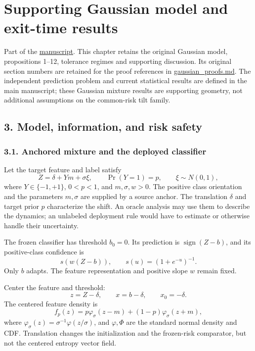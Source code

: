 \section{Supporting Gaussian model and exit-time
results}\label{draft-supporting-gaussian-model-and-exit-time-results}

Part of the \href{DRAFT.md}{manuscript}. This chapter retains the
original Gaussian model, propositions 1--12, tolerance regimes and
supporting discussion. Its original section numbers are retained for the
proof references in \url{gaussian_proofs.md}. The independent prediction
problem and current statistical results are defined in the main
manuscript; these Gaussian mixture results are supporting geometry, not
additional assumptions on the common-risk tilt family.

\subsection{3. Model, information, and risk
safety}\label{draft-model-information-and-risk-safety}

\subsubsection{3.1. Anchored mixture and the deployed
classifier}\label{draft-anchored-mixture-and-the-deployed-classifier}

Let the target feature and label satisfy \[
Z=\delta+Ym+\sigma\xi,\qquad
\Pr(Y=1)=p,\qquad \xi\sim N(0,1),
\] where \(Y\in\{-1,+1\}\), \(0<p<1\), and \(m,\sigma,w>0\). The
positive class orientation and the parameters \(m,\sigma\) are supplied
by a source anchor. The translation \(\delta\) and target prior \(p\)
characterize the shift. An oracle analysis may use them to describe the
dynamics; an unlabeled deployment rule would have to estimate or
otherwise handle their uncertainty.

The frozen classifier has threshold \(b_0=0\). Its prediction is
\(\operatorname{sign}(Z-b)\), and its positive-class confidence is \[
s(w(Z-b)),\qquad s(u)=(1+e^{-u})^{-1}.
\] Only \(b\) adapts. The feature representation and positive slope
\(w\) remain fixed.

Center the feature and threshold: \[
z=Z-\delta,\qquad x=b-\delta,\qquad x_0=-\delta.
\] The centered feature density is \[
f_p(z)=p\varphi_\sigma(z-m)+(1-p)\varphi_\sigma(z+m),
\] where \(\varphi_\sigma(z)=\sigma^{-1}\varphi(z/\sigma)\), and
\(\varphi,\Phi\) are the standard normal density and CDF. Translation
changes the initialization and the frozen-risk comparator, but not the
centered entropy vector field.

